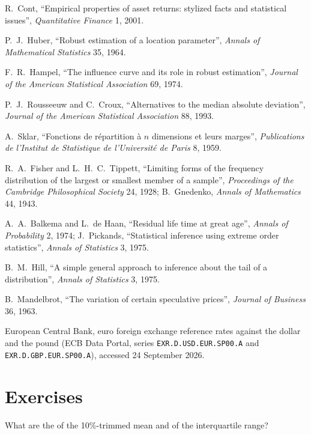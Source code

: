 \begin{omsources}
\item R.~Cont, ``Empirical properties of asset returns: stylized facts and statistical issues'', \emph{Quantitative Finance} 1, 2001.
\item P.~J.~Huber, ``Robust estimation of a location parameter'', \emph{Annals of Mathematical Statistics} 35, 1964.
\item F.~R.~Hampel, ``The influence curve and its role in robust estimation'', \emph{Journal of the American Statistical Association} 69, 1974.
\item P.~J.~Rousseeuw and C.~Croux, ``Alternatives to the median absolute deviation'', \emph{Journal of the American Statistical Association}
88, 1993.
\item A.~Sklar, ``Fonctions de répartition à $n$ dimensions et leurs marges'', \emph{Publications de l'Institut de Statistique de
l'Université de Paris} 8, 1959.
\item R.~A.~Fisher and L.~H.~C.~Tippett, ``Limiting forms of the frequency distribution of the largest or smallest member of a sample'',
\emph{Proceedings of the Cambridge Philosophical Society} 24, 1928; B.~Gnedenko, \emph{Annals of Mathematics} 44, 1943.
\item A.~A.~Balkema and L.~de Haan, ``Residual life time at great age'', \emph{Annals of Probability} 2, 1974; J.~Pickands, ``Statistical
inference using extreme order statistics'', \emph{Annals of Statistics} 3, 1975.
\item B.~M.~Hill, ``A simple general approach to inference about the tail of a distribution'', \emph{Annals of Statistics} 3, 1975.
\item B.~Mandelbrot, ``The variation of certain speculative prices'', \emph{Journal of Business} 36, 1963.
\item European Central Bank, euro foreign exchange reference rates against the dollar and the pound (ECB Data Portal, series
\texttt{EXR.D.USD.EUR.SP00.A} and \texttt{EXR.D.GBP.EUR.SP00.A}), accessed 24 September 2026.
\end{omsources}

\section{Exercises}

\begin{exercise}[$\star$]\label{exo:qm:robust-statistics-and-heavy-tails:1}
What are the  of the 10\%-trimmed mean and of the interquartile range?
\end{exercise}

